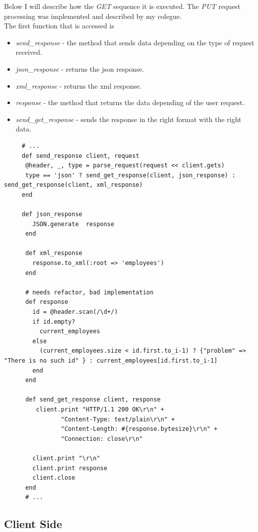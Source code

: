 \documentclass[12pt]{article}
\begin{document}
    Below I will describe how the \textit{GET} sequence it is executed. The \textit{PUT} request 
    processing was implemented and described by my colegue.  \\ 

    The first function that is accessed is 

    \begin{itemize}
      \renewcommand{\labelitemi}{$\circ$}
      \item \textit{send\_response} - the method that sends data depending on the type of request received.
      \item \textit{json\_response} - returns the json response. 
      \item \textit{xml\_response} - returns the xml response.
      \item \textit{response} - the method that returns the data depending of the user request.
      \item \textit{send\_get\_response} -  sends the response in the right format with the right data.
    \end{itemize}

    \begin{lstlisting}
     # ... 
     def send_response client, request
      @header, _, type = parse_request(request << client.gets)
      type == 'json' ? send_get_response(client, json_response) : send_get_response(client, xml_response)
     end

     def json_response
        JSON.generate  response
      end

      def xml_response
        response.to_xml(:root => 'employees')
      end

      # needs refactor, bad implementation
      def response
        id = @header.scan(/\d+/)
        if id.empty? 
          current_employees 
        else
          (current_employees.size < id.first.to_i-1) ? {"problem" => "There is no such id" } : current_employees[id.first.to_i-1]
        end
      end

      def send_get_response client, response
         client.print "HTTP/1.1 200 OK\r\n" +
                "Content-Type: text/plain\r\n" +
                "Content-Length: #{response.bytesize}\r\n" +
                "Connection: close\r\n"

        client.print "\r\n"
        client.print response
        client.close
      end
      # ...
    \end{lstlisting}

    \subsection{Client Side}
\end{document}
